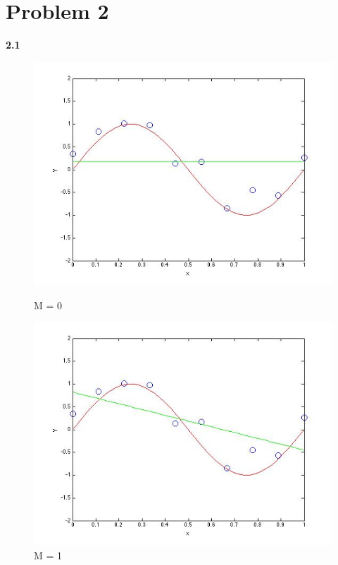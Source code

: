 \section{Problem 2}

{\bfseries 2.1}

\begin{figure}[!htb]
  \includegraphics[width=\linewidth]{figures/p2_MLE_M=0}
  \caption{M = 0}\label{fig:figures/p2_MLE_M=0}
\endminipage\hfill
{}
  \includegraphics[width=\linewidth]{figures/p2_MLE_M=1}
  \caption{M = 1}\label{fig:figures/p2_M=1}
\endminipage\hfill
{}                                                                            

\end{figure}
